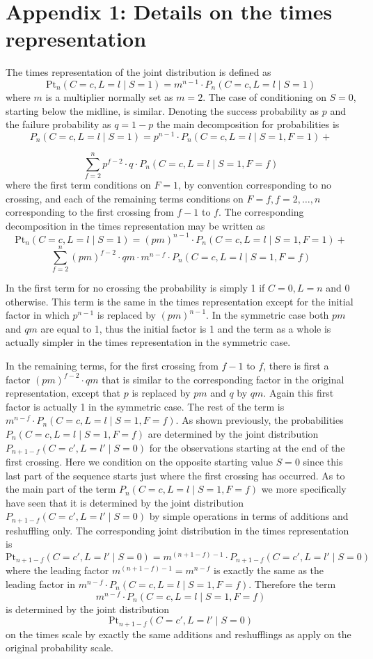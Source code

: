 \section{Appendix 1: Details on the times representation}

The times representation of the joint distribution is defined as $$\text{Pt}_n ( C=c, L=l \mid S=1 ) = m^{n-1} \cdot P_n ( C=c, L=l \mid S=1 )$$ where $m$ is a multiplier normally set as $m=2$. The case of conditioning on $S=0$, starting below the midline, is similar. Denoting the success probability as $p$ and the failure probability as $q=1-p$ the main decomposition for probabilities is $$P_n ( C=c, L=l \mid S=1) = p^{n-1} \cdot P_n ( C=c, L=l \mid S=1, F=1)+$$

$$ \sum_{f=2}^n p^{f-2} \cdot  q \cdot P_n ( C=c, L=l \mid S=1, F=f)$$
where the first term conditions on $F=1$, by convention corresponding to no crossing, and each of the remaining terms conditions on $F=f, f =2, \ldots , n$ corresponding to the first crossing from $f-1$ to $f$. The corresponding decomposition in the times representation may be written as $$\text{Pt}_n ( C=c, L=l \mid S=1) = (pm)^{n-1} \cdot P_n ( C=c, L=l \mid S=1, F=1) +$$
$$ \sum_{f=2}^n (pm)^{f-2} \cdot  qm \cdot m^{n-f} \cdot P_n ( C=c, L=l \mid S=1, F=f)$$

In the first term for no crossing the probability is simply 1 if $C=0, L=n$ and 0 otherwise. This term is the same in the times representation except for the initial factor in which $p^{n-1}$ is replaced by $(pm)^{n-1}$. In the symmetric case both $pm$ and $qm$ are equal to 1, thus the initial factor is 1 and the term as a whole is actually simpler in the times representation in the symmetric case.

In the remaining terms, for the first crossing from $f-1$ to $f$, there is first a factor $(pm)^{f-2} \cdot  qm$ that is similar to the corresponding factor in the original representation, except that $p$ is replaced by $pm$ and $q$ by $qm$. Again this first factor is actually 1 in the symmetric case. The rest of the term is $m^{n-f} \cdot P_n ( C=c, L=l \mid S=1, F=f)$. As shown previously, the probabilities $P_n ( C=c, L=l \mid S=1, F=f)$ are determined by the joint distribution $P_{n+1-f} ( C=c', L=l' \mid S=0)$ for the observations starting at the end of the first crossing. Here we condition on the opposite starting value $S=0$ since this last part of the sequence starts just where the first crossing has occurred. As to the main part of the term $P_n ( C=c, L=l \mid S=1, F=f)$ we more specifically have seen that it is determined by the joint distribution $P_{n+1-f} ( C=c', L=l' \mid S=0)$ by simple operations in terms of additions and reshuffling only. The corresponding joint distribution in the times representation is $$\text{Pt}_{n+1-f} ( C=c', L=l' \mid S=0)=m^{(n+1-f)-1} \cdot P_{n+1-f} ( C=c', L=l' \mid S=0)$$ where the leading factor $m^{(n+1-f)-1}=m^{n-f}$ is exactly the same as the leading factor in $m^{n-f} \cdot P_n ( C=c, L=l \mid S=1, F=f)$. Therefore the term $$m^{n-f} \cdot P_n ( C=c, L=l \mid S=1, F=f)$$ is determined by the joint distribution $$\text{Pt}_{n+1-f} ( C=c', L=l' \mid S=0)$$ on the times scale by exactly the same additions and reshufflings as apply on the original probability scale.


